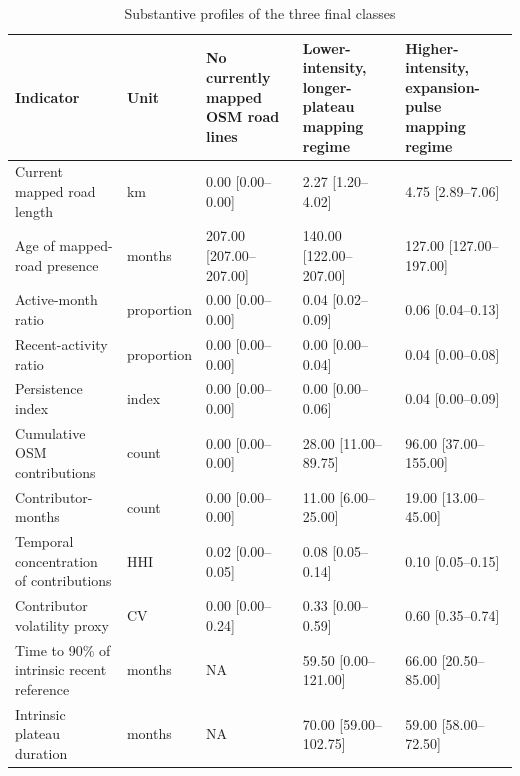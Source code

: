 \begin{table}
\caption{Substantive profiles of the three final classes}
\label{tab:table_02_substantive_class_profiles}
\begin{tabular}{lllll}
\toprule
Indicator & Unit & No currently mapped OSM road lines & Lower-intensity, longer-plateau mapping regime & Higher-intensity, expansion-pulse mapping regime \\
\midrule
Current mapped road length & km & 0.00 [0.00–0.00] & 2.27 [1.20–4.02] & 4.75 [2.89–7.06] \\
Age of mapped-road presence & months & 207.00 [207.00–207.00] & 140.00 [122.00–207.00] & 127.00 [127.00–197.00] \\
Active-month ratio & proportion & 0.00 [0.00–0.00] & 0.04 [0.02–0.09] & 0.06 [0.04–0.13] \\
Recent-activity ratio & proportion & 0.00 [0.00–0.00] & 0.00 [0.00–0.04] & 0.04 [0.00–0.08] \\
Persistence index & index & 0.00 [0.00–0.00] & 0.00 [0.00–0.06] & 0.04 [0.00–0.09] \\
Cumulative OSM contributions & count & 0.00 [0.00–0.00] & 28.00 [11.00–89.75] & 96.00 [37.00–155.00] \\
Contributor-months & count & 0.00 [0.00–0.00] & 11.00 [6.00–25.00] & 19.00 [13.00–45.00] \\
Temporal concentration of contributions & HHI & 0.02 [0.00–0.05] & 0.08 [0.05–0.14] & 0.10 [0.05–0.15] \\
Contributor volatility proxy & CV & 0.00 [0.00–0.24] & 0.33 [0.00–0.59] & 0.60 [0.35–0.74] \\
Time to 90\% of intrinsic recent reference & months & NA & 59.50 [0.00–121.00] & 66.00 [20.50–85.00] \\
Intrinsic plateau duration & months & NA & 70.00 [59.00–102.75] & 59.00 [58.00–72.50] \\
\bottomrule
\end{tabular}
\end{table}


